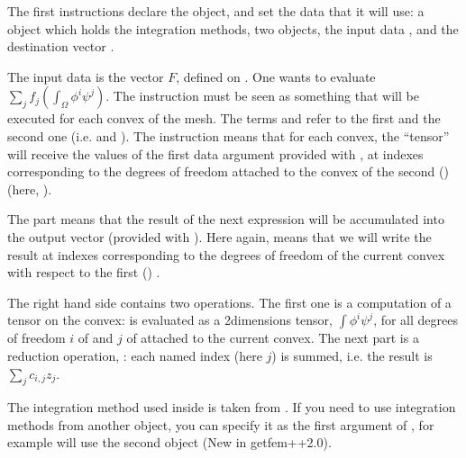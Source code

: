 \documentclass[a4paper,11pt,english]{sphinxmanual}
\begin{document}
The first instructions declare the object, and set the data that it will use: a
 object which holds the integration methods, two  objects, the input data
, and the destination vector .

The input data is the vector \(F\), defined on . One wants to
evaluate \(\sum_{j} f_j (\int_\Omega \phi^i \psi^j)\). The instruction must be
seen as something that will be executed for each convex  of the mesh. The
terms  and  refer to the first  and the second one (i.e. 
and ).  The instruction  means that for each convex, the
“tensor”  will receive the values of the first data argument provided with
, at indexes corresponding to the degrees of freedom attached to the
convex of the second ()  (here, ).

The part  means that the result of the next expression will be
accumulated into the output vector (provided with ). Here again,
 means that we will write the result at indexes corresponding to the degrees
of freedom of the current convex with respect to the first () .

The right hand side  contains two operations.
The first one is a computation of a tensor on the convex:
 is evaluated as a 2\sphinxhyphen{}dimensions tensor,
\(\int\phi^i \psi^j\), for all degrees of freedom \(i\) of  and
\(j\) of  attached to the current convex. The next part is a
reduction operation, : each named index (here \(j\)) is summed,
i.e. the result is \(\sum_j c_{i,j} z_j\).

The integration method used inside  is taken from
. If you need to use integration methods from another  object, you can
specify it as the first argument of , for example  will use the second  object (New in getfem++\sphinxhyphen{}2.0).
\end{document}
